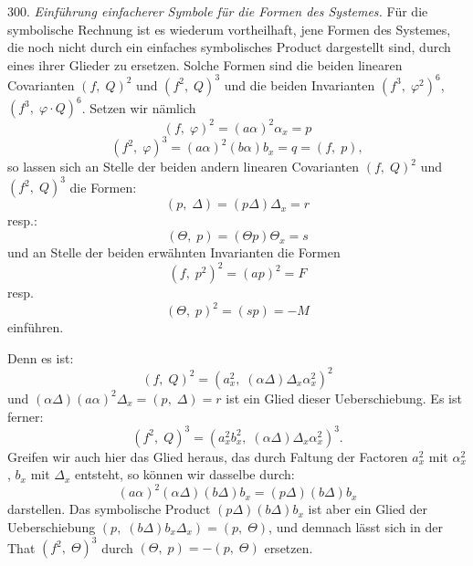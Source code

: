 \documentclass[11pt]{article}
\providecommand{\weq}[2]{\begin{equation}\tag{#1}#2\end{equation}}
\let\Delta\varDelta
\let\Theta\varTheta
\begin{document}
300. \textit{Einführung einfacherer Symbole für die Formen des Systemes.} Für die symbolische Rechnung ist es wiederum vortheilhaft, jene Formen des Systemes, die noch nicht durch ein einfaches symbolisches Product dargestellt sind, durch eines ihrer Glieder zu ersetzen. Solche Formen sind die beiden linearen Covarianten $(f, \; Q)^2$ und $(f^2, \; Q)^3$ und die beiden Invarianten $(f^3, \; \varphi^2)^6$, $(f^3, \; \varphi \cdot Q)^6$. Setzen wir nämlich
\[
(f, \; \varphi)^2 = (a\alpha)^2 \alpha_x = p
\]
\[
(f^2, \; \varphi)^3 = (a\alpha)^2 (b\alpha) b_x = q = (f, \; p),
\]
so lassen sich an Stelle der beiden andern linearen Covarianten $(f, \; Q)^2$ und $(f^2, \; Q)^3$ die Formen:
\weq{1}{(p, \; \Delta) = (p\Delta)\Delta_x = r}
resp.:
\weq{2}{(\Theta, \; p) = (\Theta p)\Theta_x = s}
und an Stelle der beiden erwähnten Invarianten die Formen
\weq{3}{(f, \; p^2)^2 = (ap)^2 = F}
resp.
\weq{4}{(\Theta, \; p)^2 = (sp) = -M}
einführen.

Denn es ist:
\[
(f, \; Q)^2 = (a_x^2, \; (\alpha\Delta)\Delta_x \alpha_x^2)^2
\]
und $(\alpha\Delta)(a\alpha)^2\Delta_x = (p, \; \Delta) = r$ ist ein Glied dieser Ueberschiebung. Es ist ferner:
\[
(f^2, \; Q)^3 = (a_x^2 b_x^2, \; (\alpha\Delta)\Delta_x \alpha_x^2)^3.
\]
Greifen wir auch hier das Glied heraus, das durch Faltung der Factoren $a_x^2$ mit $\alpha_x^2$, $b_x$ mit $\Delta_x$ entsteht, so können wir dasselbe durch:
\[
(a\alpha)^2(\alpha\Delta)(b\Delta)b_x = (p\Delta)(b\Delta)b_x
\]
darstellen. Das symbolische Product $(p\Delta)(b\Delta)b_x$ ist aber ein Glied der Ueberschiebung $(p, \; (b\Delta)b_x\Delta_x) = (p, \; \Theta)$, und demnach lässt sich in der That $(f^2, \; \Theta)^3$ durch $(\Theta, \; p) = -(p, \; \Theta)$ ersetzen.
\end{document}

